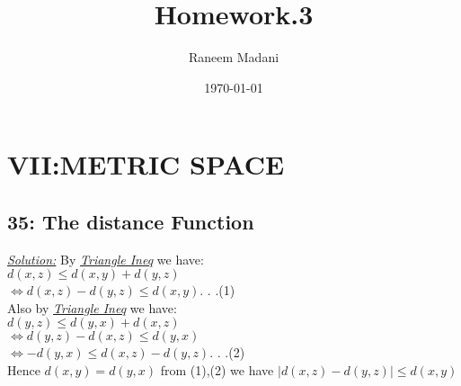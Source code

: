 \documentclass{amsbook}
\title{\Huge Homework.3}
\author{\huge Raneem Madani }
\date{\today}
\begin{document}
\maketitle
\tableofcontents



\chapter{ VII:METRIC SPACE}
\section{35: The distance Function}


\begin{tcolorbox}[enhanced,attach boxed title to top center={yshift=-3mm,yshifttext=-1mm},
  colback=blue!5!white,colframe=blue!75!black,colbacktitle=red!80!black,
  title=Exercise 35.3:,fonttitle=\bfseries,
  boxed title style={size=small,colframe=red!50!black} ]
     \textit{\color{blue}\underline{Solution:}}
     By \textit{\underline{Triangle Ineq}} we have:\\
$d(x,z)\leq d(x,y)+d(y,z)$\\
$\Leftrightarrow d(x,z)-d(y,z) \leq d(x,y) $. . .(1)\\
Also by \textit{\underline{Triangle Ineq}} we have:\\
$d(y,z)\leq d(y,x)+d(x,z)$\\
$\Leftrightarrow d(y,z)-d(x,z)\leq d(y,x) $\\
$\Leftrightarrow -d(y,x)\leq d(x,z)-d(y,z)$. . .(2)\\
Hence $d(x,y)=d(y,x)$ from (1),(2) we have $|d(x,z)-d(y,z)|\leq d(x,y)$
\end{tcolorbox}
\end{document}

